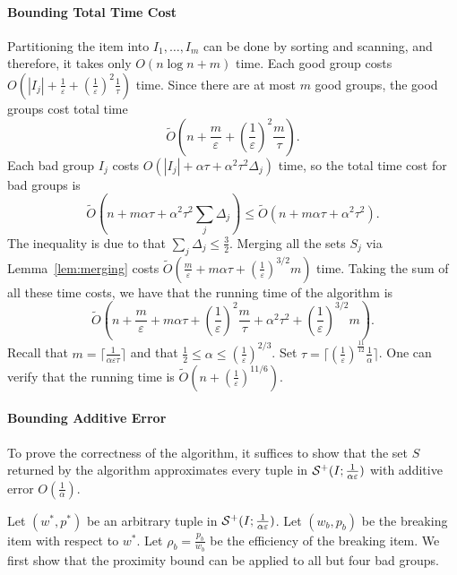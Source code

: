 \documentclass[a4paper,UKenglish,cleveref, autoref, thm-restate, pdfa]{lipics-v2021}
\newcommand{\eps}{\varepsilon}
\renewcommand{\leq}{\leqslant}
\begin{document}
\paragraph*{Bounding Total Time Cost}
Partitioning the item into $I_1, \ldots, I_m$ can be done by sorting and scanning, and therefore, it takes only $O(n\log n + m)$ time. Each good group costs $O(|I_j| + \frac{1}{\eps} + (\frac{1}{\eps})^2\frac{1}{\tau})$ time. Since there are at most $m$ good groups, the good groups cost  total time
\[
    \tilde{O}\left(n + \frac{m}{\eps} + (\frac{1}{\eps})^2\frac{m}{\tau}\right).
\]
Each bad group $I_j$ costs $O(|I_j| + \alpha\tau + \alpha^2\tau^2\Delta_j)$ time, so the total time cost for bad groups is
\[
    \tilde{O}(n + m\alpha\tau + \alpha^2\tau^2\sum_j\Delta_j) \leq \tilde{O}(n + m\alpha\tau + \alpha^2\tau^2).
\]
The inequality is due to that $\sum_j\Delta_j \leq \frac{3}{2}$. Merging all the sets $S_j$ via Lemma~\ref{lem:merging} costs $\tilde{O}(\frac{m}{\eps} + m\alpha\tau + (\frac{1}{\eps})^{3/2}m)$ time. Taking the sum of all these time costs, we have that the running time of the algorithm is
\[
    \tilde{O}\left(n  + \frac{m}{\eps} + m\alpha\tau + (\frac{1}{\eps})^2\frac{m}{\tau} + \alpha^2\tau^2 + (\frac{1}{\eps})^{3/2}m\right).
\]
Recall that $m = \lceil \frac{1}{\alpha\eps\tau} \rceil$ and that $\frac{1}{2} \leq \alpha \leq (\frac{1}{\eps})^{2/3}$. Set $\tau = \lceil(\frac{1}{\eps})^\frac{11}{12}\frac{1}{\alpha}\rceil$. One can verify that the running time is $\tilde{O}(n + (\frac{1}{\eps})^{11/6})$.

\paragraph*{Bounding Additive Error}
To prove the correctness of the algorithm, it suffices to show that the set $S$ returned by the algorithm approximates every tuple in ${\cal S}^+(I; \frac{1}{\alpha\eps})$ with additive error $O(\frac{1}{\alpha})$. 

Let $(w^*, p^*)$ be an arbitrary tuple in ${\cal S}^+(I; \frac{1}{\alpha\eps})$.  Let $(w_b, p_b)$ be the breaking item with respect to $w^*$. Let $\rho_b = \frac{p_b}{w_b}$ be the efficiency of the breaking item. We first show that the proximity bound can be applied to all but four bad groups.
\end{document}
